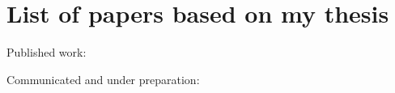 \chapter*{List of papers based on my thesis}
\renewcommand{\baselinestretch}{.4}
Published work:
\begin{itemize}

\end{itemize}

Communicated and under preparation:
\begin{itemize}



\end{itemize}

\clearpage

